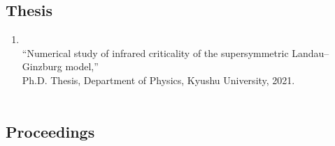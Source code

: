 \subsection{Thesis}
\begin{enumerate}
 \item \OM\\
       ``Numerical study of infrared criticality of the supersymmetric Landau--Ginzburg model,''\\
       Ph.D. Thesis, Department of Physics, Kyushu University, 2021.\\
    \\
\end{enumerate}

\subsection{Proceedings}
